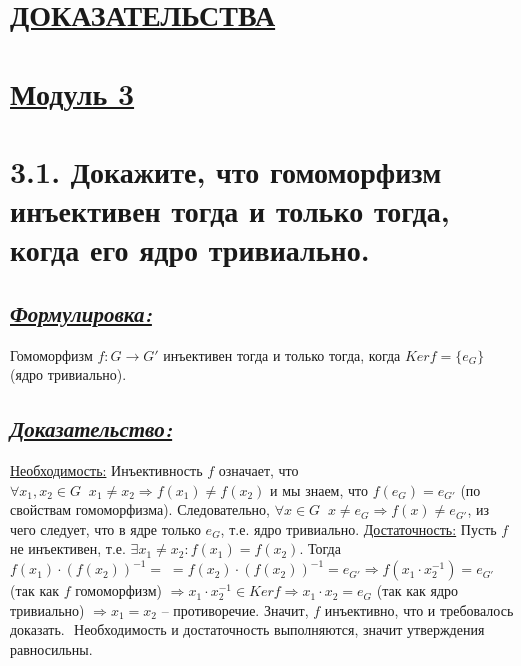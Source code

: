 \documentclass{article}
\begin{document}
\newpage
{}
\section*{\LARGE\centering \underline{ДОКАЗАТЕЛЬСТВА}}

\section*{\LARGE\centering \underline{Модуль 3}}

\section*{\LARGE 3.1. Докажите, что гомоморфизм инъективен тогда и только тогда, когда его ядро тривиально. }
\subsection*{\Large \underline{\textit{Формулировка: }}}
Гомоморфизм $f : G \rightarrow G'$ инъективен тогда и только тогда, когда $Kerf = \{e_G\}$ (ядро тривиально).

\subsection*{\Large \underline{\textit{Доказательство: }}}

$ $\indent\underline{Необходимость:}
\newline Инъективность $f$ означает, что $\forall x_1, x_2 \in G \;\; x_1 \ne x_2 \Rightarrow f(x_1) \ne f(x_2)$ и мы знаем, что $f(e_G) = e_{G'}$ (по свойствам гомоморфизма). Следовательно, \newline $\forall x \in G \;\; x \ne e_G \Rightarrow f(x) \ne e_{G'}$, из чего следует, что в ядре только $e_G$, т.е. ядро тривиально.
\newline \indent \underline{Достаточность:}
\newline Пусть $f$ не инъективен, т.е. $\exists x_1 \ne x_2 : f(x_1) = f(x_2)$. Тогда $f(x_1) \cdot (f(x_2))^{-1} = \; = f(x_2) \cdot (f(x_2))^{-1} = e_{G'} \Rightarrow f(x_1 \cdot x_2^{-1}) = e_{G'}$ (так как $f$ гомоморфизм) $\Rightarrow x_1\cdot x_2^{-1} \in Kerf \Rightarrow x_1\cdot x_2 = e_{G}$ (так как ядро тривиально) $\Rightarrow x_1 = x_2$ -- противоречие. Значит, $f$ инъективно, что и требовалось доказать.
\newline $ $
\newline Необходимость и достаточность выполняются, значит утверждения равносильны.
\end{document}
